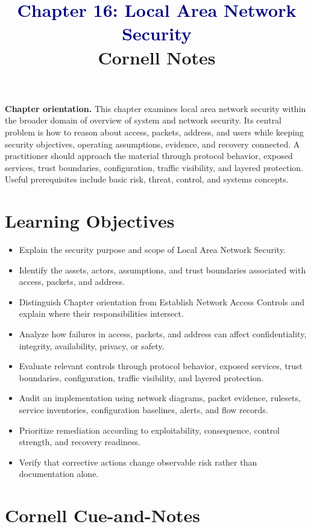 \documentclass[11pt]{article}
\title{\textcolor{Navy}{Chapter 16: Local Area Network Security}\\[2mm]\large Cornell Notes}
\author{}
\date{}
\begin{document}
\maketitle
\thispagestyle{fancy}
\vspace{-1.5em}
\begin{orientationbox}
\textbf{Chapter orientation.} This chapter examines local area network security within the broader domain of overview of system and network security. Its central problem is how to reason about access, packets, address, and users while keeping security objectives, operating assumptions, evidence, and recovery connected. A practitioner should approach the material through protocol behavior, exposed services, trust boundaries, configuration, traffic visibility, and layered protection. Useful prerequisites include basic risk, threat, control, and systems concepts.
\end{orientationbox}
\section*{Learning Objectives}
\begin{itemize}
\item Explain the security purpose and scope of Local Area Network Security.
\item Identify the assets, actors, assumptions, and trust boundaries associated with access, packets, and address.
\item Distinguish Chapter orientation from Establish Network Access Controls and explain where their responsibilities intersect.
\item Analyze how failures in access, packets, and address can affect confidentiality, integrity, availability, privacy, or safety.
\item Evaluate relevant controls through protocol behavior, exposed services, trust boundaries, configuration, traffic visibility, and layered protection.
\item Audit an implementation using network diagrams, packet evidence, rulesets, service inventories, configuration baselines, alerts, and flow records.
\item Prioritize remediation according to exploitability, consequence, control strength, and recovery readiness.
\item Verify that corrective actions change observable risk rather than documentation alone.
\end{itemize}
\section*{Cornell Cue-and-Notes}
\end{document}
